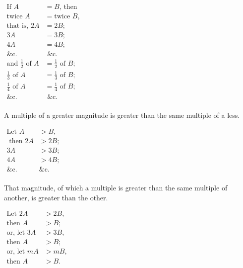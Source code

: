 \documentclass[booklanguage=english]{byrnebook}
\begin{document}
\begin{center}
$
\begin{aligned}
	\mbox{If } A &= B \mbox{, then}\\
	\mbox{twice } A &= \mbox{twice } B \mbox{,}\\
	\mbox{that is, }2A &= 2B \mbox{;}\\
	3A &= 3B \mbox{;}\\
	4A &= 4B \mbox{;}\\
	\mbox{\&c.} & \mbox{ \&c.}\\
	\mbox{and } \frac{1}{2} \mbox{ of } A &= \frac{1}{2} \mbox{ of } B \mbox{;}\\
	\frac{1}{3} \mbox{ of } A &= \frac{1}{3} \mbox{ of } B \mbox{;}\\
	\frac{1}{4} \mbox{ of } A &= \frac{1}{4} \mbox{ of } B \mbox{;}\\
	\mbox{\&c. } & \mbox{ \&c.}\\
\end{aligned}
$
\end{center}

\startaxiom{}
A multiple of a greater magnitude is greater than the same multiple of a less.

\begin{center}
$\begin{aligned}
	\mbox{Let } A &> B \mbox{,} \\
	\mbox{ then } 2A &> 2B \mbox{;}\\
	3A&> 3B \mbox{;} \\
	4A &> 4B \mbox{;}\\
	\mbox{\&c. } &\mbox{\&c.} \\
\end{aligned}
$
\end{center}

\startaxiom{}
That magnitude, of which a multiple is greater than the same multiple of another, is greater than the other.

\begin{center}
$\begin{aligned}
\mbox{Let } 2A &> 2B \mbox{,}\\
\mbox{then } A &> B \mbox{;}\\
\mbox{or, let } 3A &> 3B \mbox{,}\\
\mbox{then } A &> B \mbox{;}\\
\mbox{or, let } mA &> mB  \mbox{,}\\
\mbox{then } A &> B \mbox{.}\\
\end{aligned}$
\end{center}
\end{document}
